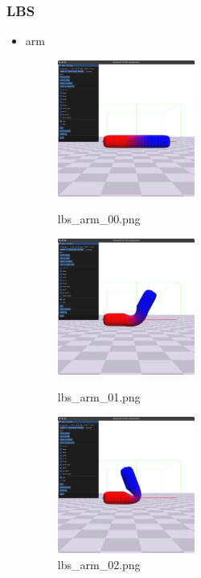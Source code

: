 \documentclass[a4paper,10pt,uplatex,dvipdfmx]{jsarticle}
\begin{document}
\subsubsection{LBS}
\begin{itemize}
  \item arm
  \begin{figure}[H]
    \begin{minipage}{0.33\hsize}
      \begin{center}
        \includegraphics[width=45mm]{img/lbs_arm_00.png}
        \caption{lbs\_arm\_00.png}
      \end{center}
    \end{minipage}
    \begin{minipage}{0.33\hsize}
      \begin{center}
        \includegraphics[width=45mm]{img/lbs_arm_01.png}
        \caption{lbs\_arm\_01.png}
      \end{center}
    \end{minipage}
    \begin{minipage}{0.33\hsize}
      \begin{center}
        \includegraphics[width=45mm]{img/lbs_arm_02.png}
        \caption{lbs\_arm\_02.png}
      \end{center}
    \end{minipage}
  \end{figure}
  

\end{itemize}
\end{document}
